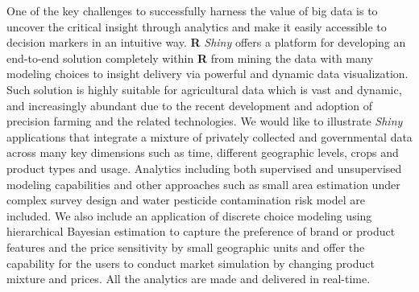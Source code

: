 \documentclass[\main/boa.tex]{subfiles}
\begin{document}
One of the key challenges to successfully harness the value of big data
is to uncover the critical insight through analytics and make it easily
accessible to decision markers in an intuitive way. \textbf{R}
\emph{Shiny} offers a platform for developing an end-to-end solution
completely within \textbf{R} from mining the data with many modeling
choices to insight delivery via powerful and dynamic data visualization.
Such solution is highly suitable for agricultural data which is vast and
dynamic, and increasingly abundant due to the recent development and
adoption of precision farming and the related technologies. We would
like to illustrate \emph{Shiny} applications that integrate a mixture
of privately collected and governmental data across many key dimensions
such as time, different geographic levels, 
crops and product types and usage. Analytics including both supervised and 
unsupervised modeling capabilities and other approaches such as 
small area estimation under complex survey design and 
water pesticide contamination risk model are included. 
We also include an application of discrete choice modeling using
hierarchical Bayesian estimation to capture the preference of brand or
product features and the price sensitivity by small geographic units and offer 
the capability for the users to conduct market simulation by changing product
mixture and prices. All the analytics are made and delivered in
real-time.
\end{document}
